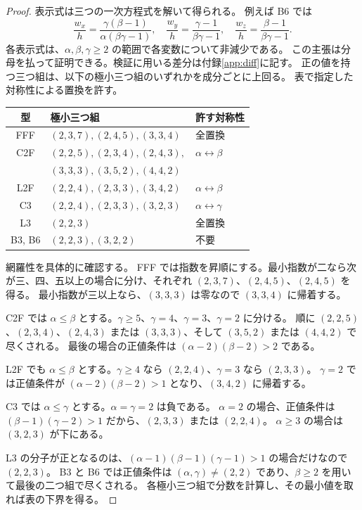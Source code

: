 \documentclass[11pt,a4paper]{ltjsarticle}
\numberwithin{equation}{section}
\theoremstyle{definition}
\begin{document}
\begin{proof}
表示式は三つの一次方程式を解いて得られる。
例えば B6 では
\[
 \frac{w_x}{h}=\frac{\gamma(\beta-1)}{\alpha(\beta\gamma-1)},\quad
 \frac{w_y}{h}=\frac{\gamma-1}{\beta\gamma-1},\quad
 \frac{w_z}{h}=\frac{\beta-1}{\beta\gamma-1}.
\]
各表示式は、$\alpha,\beta,\gamma\ge2$ の範囲で各変数について非減少である。
この主張は分母を払って証明できる。検証に用いる差分は付録\ref{app:diff}に記す。
正の値を持つ三つ組は、以下の極小三つ組のいずれかを成分ごとに上回る。
表で指定した対称性による置換を許す。
\begin{center}\small
\begin{tabular}{cll}
\toprule
型 & 極小三つ組 & 許す対称性\\\midrule
FFF & $(2,3,7),(2,4,5),(3,3,4)$ & 全置換\\
C2F & $(2,2,5),(2,3,4),(2,4,3),$ & $\alpha\leftrightarrow\beta$\\
& $(3,3,3),(3,5,2),(4,4,2)$ & \\
L2F & $(2,2,4),(2,3,3),(3,4,2)$ & $\alpha\leftrightarrow\beta$\\
C3 & $(2,2,4),(2,3,3),(3,2,3)$ & $\alpha\leftrightarrow\gamma$\\
L3 & $(2,2,3)$ & 全置換\\
B3, B6 & $(2,2,3),(3,2,2)$ & 不要\\\bottomrule
\end{tabular}
\end{center}
網羅性を具体的に確認する。
FFF では指数を昇順にする。最小指数が二なら次が三、四、五以上の場合に分け、それぞれ $(2,3,7)$、$(2,4,5)$、$(2,4,5)$ を得る。
最小指数が三以上なら、$(3,3,3)$ は零なので $(3,3,4)$ に帰着する。

C2F では $\alpha\le\beta$ とする。$\gamma\ge5$、$\gamma=4$、$\gamma=3$、$\gamma=2$ に分ける。
順に $(2,2,5)$、$(2,3,4)$、$(2,4,3)$ または $(3,3,3)$、そして $(3,5,2)$ または $(4,4,2)$ で尽くされる。
最後の場合の正値条件は $(\alpha-2)(\beta-2)>2$ である。

L2F でも $\alpha\le\beta$ とする。$\gamma\ge4$ なら $(2,2,4)$、$\gamma=3$ なら $(2,3,3)$。
$\gamma=2$ では正値条件が $(\alpha-2)(\beta-2)>1$ となり、$(3,4,2)$ に帰着する。

C3 では $\alpha\le\gamma$ とする。$\alpha=\gamma=2$ は負である。
$\alpha=2$ の場合、正値条件は $(\beta-1)(\gamma-2)>1$ だから、$(2,3,3)$ または $(2,2,4)$。
$\alpha\ge3$ の場合は $(3,2,3)$ が下にある。

L3 の分子が正となるのは、$(\alpha-1)(\beta-1)(\gamma-1)>1$ の場合だけなので $(2,2,3)$。
B3 と B6 では正値条件は $(\alpha,\gamma)\ne(2,2)$ であり、$\beta\ge2$ を用いて最後の二つ組で尽くされる。
各極小三つ組で分数を計算し、その最小値を取れば表の下界を得る。
\end{proof}
\end{document}
